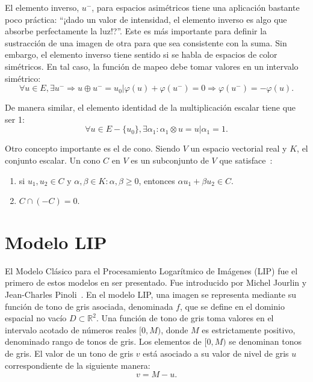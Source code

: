 El elemento inverso, $u^-$, para espacios asimétricos tiene una aplicación bastante poco práctica: ``\textquestiondown¡dado un valor de intensidad, el elemento inverso es algo que absorbe perfectamente la luz!?''. Este es más importante para definir la sustracción de una imagen de otra para que sea consistente con la suma. Sin embargo, el elemento inverso tiene sentido si se habla de espacios de color simétricos. En tal caso, la función de mapeo debe tomar valores en un intervalo simétrico:
\begin{equation}
	\forall u \in E, \exists u^- \Rightarrow u \oplus u^- = u_0 | \varphi(u) + \varphi(u^-) = 0 \Rightarrow \varphi(u^-)=-\varphi(u). 
\end{equation}

De manera similar, el elemento identidad de la multiplicación escalar tiene que ser 1:
\begin{equation}
	\forall u \in E - \{u_0\}, \exists \alpha_1 : \alpha_1 \otimes u = u | \alpha_1 = 1.
\end{equation}

Otro concepto importante es el de cono. Siendo $V$ un espacio vectorial real y $K$, el conjunto escalar. Un cono $C$ en $V$ es un subconjunto de $V$ que satisface~\cite{barker1981theory}:
\begin{enumerate}
	\item si $u_1,u_2\in C$ y $\alpha,\beta\in K:\alpha,\beta\geq0$, entonces $\alpha u_1+\beta u_2\in C$.
	\item $C \cap (-C)={0}$.
\end{enumerate}

\section{Modelo LIP}

El Modelo Cl\'asico para el Procesamiento Logar\'itmico de Im\'agenes (LIP) fue el primero de estos modelos en ser presentado. Fue introducido por Michel Jourlin y Jean-Charles Pinoli~\cite{jourlin1988model}. En el modelo LIP, una imagen se representa mediante su función de tono de gris asociada, denominada $f$, que se define en el dominio espacial no vacío $D \subset \mathbb{R}^2$. Una función de tono de gris toma valores en el intervalo acotado de números reales $[0, M)$, donde $M$ es estrictamente positivo, denominado rango de tonos de gris. Los elementos de $[0, M )$ se denominan tonos de gris. El valor de un tono de gris $v$ est\'a asociado a su valor de nivel de gris $u$ correspondiente de la siguiente manera:
\begin{equation}
	v = M - u.
\end{equation}

